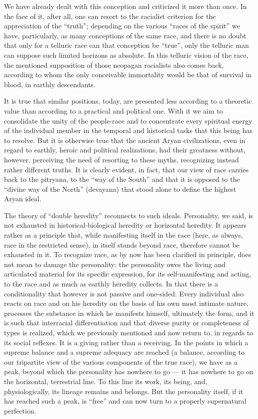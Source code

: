We have already dealt with this conception and criticized it more than once. In the face of it, after all, one can resort to the racialist criterion for the appreciation of the ``truth''; depending on the various ``races of the spirit'' we have, particularly, as many conceptions of the same race, and there is no doubt that only for a telluric race can that conception be ``true'', only the telluric man can suppose such limited horizons as absolute. In this telluric vision of the race, the mentioned supposition of those neopagan racialists also comes back, according to whom the only conceivable immortality would be that of survival in blood, in earthly descendants.

It is true that similar positions, today, are presented less according to a theoretic value than according to a practical and political one. With it we aim to consolidate the unity of the people-race and to concentrate every spiritual energy of the individual member in the temporal and historical tasks that this being has to resolve. But it is otherwise true that the ancient Aryan civilizations, even in regard to earthly, heroic and political realizations, had their greatness without, however, perceiving the need of resorting to these myths, recognizing instead rather different truths. It is clearly evident, in fact, that our view of race carries back to the pitryana, to the ``way of the South'' and that it is opposed to the ``divine way of the North'' (devayana) that stood alone to define the highest Aryan ideal.

The theory of ``double heredity'' reconnects to such ideals. Personality, we said, is not exhausted in historical-biological heredity or horizontal heredity. It appears rather as a principle that, while manifesting itself in the race (here, as always, race in the restricted sense), in itself stands beyond race, therefore cannot be exhausted in it. To recognize race, as by now has been clarified in principle, does not mean to damage the personality: the personality owes the living and articulated material for its specific expression, for its self-manifesting and acting, to the race and as much as earthly heredity collects. In that there is a conditionality that however is not passive and one-sided. Every individual also reacts on race and on his heredity on the basis of his own most intimate nature, processes the substance in which he manifests himself, ultimately the form, and it is such that interracial differentiation and that diverse purity or completeness of types is realized, which we previously mentioned and now return to, in regards to its social reflexes. It is a giving rather than a receiving. In the points in which a supreme balance and a supreme adequacy are reached (a balance, according to our tripartite view of the various components of the true race), we have as a peak, beyond which the personality has nowhere to go --- it has nowhere to go on the horizontal, terrestrial line. To this line its work, its being, and, physiologically, its lineage remains and belongs. But the personality itself, if it has reached such a peak, is ``free'' and can now turn to a properly supernatural perfection.

